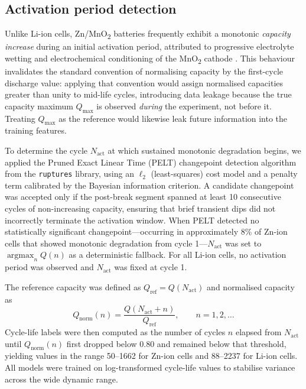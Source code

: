 \subsection{Activation period detection}
\label{sec:activation}

Unlike Li-ion cells, Zn/MnO\textsubscript{2} batteries frequently exhibit a
monotonic \emph{capacity increase} during an initial activation period,
attributed to progressive electrolyte wetting and electrochemical conditioning
of the MnO\textsubscript{2} cathode \cite{tan2024}.  This behaviour
invalidates the standard convention of normalising capacity by the
first-cycle discharge value: applying that convention would assign
normalised capacities greater than unity to mid-life cycles, introducing
data leakage because the true capacity maximum $Q_{\max}$ is observed
\emph{during} the experiment, not before it.  Treating $Q_{\max}$ as
the reference would likewise leak future information into the training
features.

To determine the cycle $N_{\mathrm{act}}$ at which sustained monotonic
degradation begins, we applied the Pruned Exact Linear Time (PELT)
changepoint detection algorithm \cite{truong2020} from the
\texttt{ruptures} library, using an $\ell_2$ (least-squares) cost model and
a penalty term calibrated by the Bayesian information criterion.
A candidate changepoint was accepted only if the post-break segment spanned
at least 10 consecutive cycles of non-increasing capacity, ensuring that
brief transient dips did not incorrectly terminate the activation window.
When PELT detected no statistically significant changepoint---occurring in
approximately 8\% of Zn-ion cells that showed monotonic degradation from
cycle 1---$N_{\mathrm{act}}$ was set to $\operatorname{argmax}_n Q(n)$ as a
deterministic fallback.  For all Li-ion cells, no activation period was
observed and $N_{\mathrm{act}}$ was fixed at cycle 1.

The reference capacity was defined as $Q_{\mathrm{ref}} = Q(N_{\mathrm{act}})$
and normalised capacity as
\begin{equation}
  Q_{\mathrm{norm}}(n) = \frac{Q\!\left(N_{\mathrm{act}} + n\right)}{Q_{\mathrm{ref}}},
  \qquad n = 1, 2, \ldots
  \label{eq:qnorm}
\end{equation}
Cycle-life labels were then computed as the number of cycles $n$ elapsed from
$N_{\mathrm{act}}$ until $Q_{\mathrm{norm}}(n)$ first dropped below 0.80 and
remained below that threshold, yielding values in the range 50--1662 for
Zn-ion cells and 88--2237 for Li-ion cells.  All models were trained on
log-transformed cycle-life values to stabilise variance across the wide
dynamic range.

